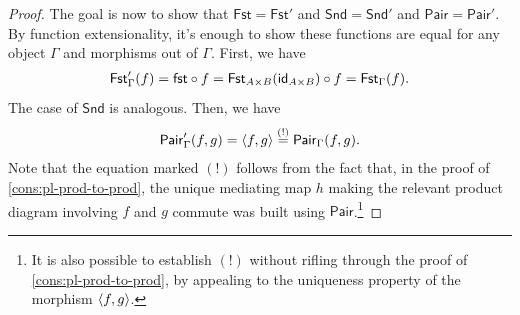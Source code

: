 \begin{proof}
  The goal is now to show that \(\mathsf{Fst} = \mathsf{Fst}'\) and \(\mathsf{Snd} = \mathsf{Snd}'\) and \(\mathsf{Pair} = \mathsf{Pair}'\).
  By function extensionality, it's enough to show these functions are equal for any object \(\Gamma\) and morphisms out of \(\Gamma\).
  First, we have
  \begin{align*}
    \mathsf{Fst}'_\Gamma(f) = \mathsf{fst}\circ f = \mathsf{Fst}_{A\times B}(\mathsf{id}_{A\times B})\circ f = \mathsf{Fst}_\Gamma(f).
  \end{align*}
  The case of \(\mathsf{Snd}\) is analogous.
  Then, we have
  \begin{align*}
    \mathsf{Pair}'_\Gamma(f,g) = \langle f,g\rangle \stackrel{(!)}= \mathsf{Pair}_\Gamma(f,g).
  \end{align*}
  Note that the equation marked \((!)\) follows from the fact that, in the proof of \cref{cons:pl-prod-to-prod},
  the unique mediating map \(h\) making the relevant product diagram involving \(f\) and \(g\)
  commute was built using \(\mathsf{Pair}\).\footnote{%
   It is also possible to establish \((!)\) without rifling through the proof of \cref{cons:pl-prod-to-prod},
   by appealing to the uniqueness property of the morphism \(\langle f,g\rangle\).}
\end{proof}



